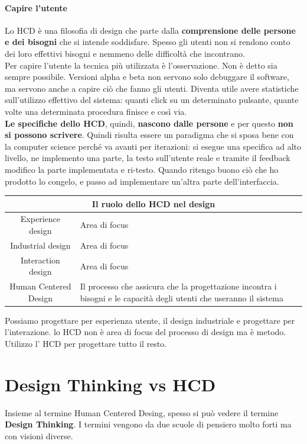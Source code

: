\documentclass[10pt]{article}
\begin{document}
\paragraph{Capire l'utente} Lo HCD è una filosofia di design che parte dalla \textbf{comprensione delle persone e dei bisogni} che si intende soddisfare. Spesso gli utenti non si rendono conto dei loro effettivi bisogni e nemmeno delle difficoltà che incontrano.\\
Per capire l'utente la tecnica più utilizzata è l'osservazione. Non è detto sia sempre possibile. Versioni alpha e beta non servono solo debuggare il software, ma servono anche a capire ciò che fanno gli utenti. Diventa utile avere statistiche sull'utilizzo effettivo del sistema: quanti click su un determinato pulsante, quante volte una determinata procedura finisce e così via.\\
\textbf{Le specifiche dello HCD}, quindi, \textbf{nascono dalle persone} e per questo \textbf{non si possono scrivere}. Quindi risulta essere un paradigma che si sposa bene con la computer science perché va avanti per iterazioni: si esegue una specifica ad alto livello, ne implemento una parte, la testo sull'utente reale e tramite il feedback modifico la parte implementata e ri-testo. Quando ritengo buono ciò che ho prodotto lo congelo, e passo ad implementare un'altra parte dell'interfaccia.\\
\begin{multicols}{2}
\begin{tabular}{ c | m{10em} }
\multicolumn{2}{c}{ \textbf{Il ruolo dello HCD nel design} }\\
\hline
Experience design & Area di focus\\
\hline
Industrial design & Area di focus\\
\hline
Interaction design & Area di focus\\
\hline
Human Centered Design & Il processo che assicura che la progettazione incontra i bisogni e le capacità degli utenti che useranno il sistema
\end{tabular}
\columnbreak

Possiamo progettare per esperienza utente, il design industriale e progettare per l'interazione. lo HCD non è area di focus del processo di design ma è metodo.\\Utilizzo l' HCD per progettare tutto il resto.
\end{multicols}
\section{Design Thinking vs HCD}
Insieme al termine Human Centered Desing, spesso si può vedere il termine \textbf{Design Thinking}. I termini vengono da due scuole di pensiero molto forti ma con visioni diverse.
\end{document}
